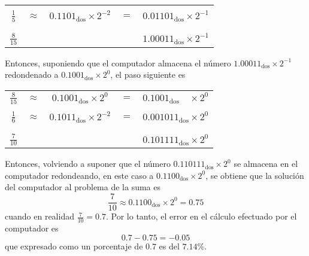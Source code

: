 \begin{solucion}
\begin{enumerate}
\begin{center}
\begin{tabular}{ccccc}
    \vspace{-0.3cm} 
    \\
    $\frac{1}{5}$ & $\approx$ & $0.1101_{\text{dos}} \times 2^{-2}$ & $=$ & $0.01101_{\text{dos}} \times 2^{-1}$ \\
    \vspace{-0.4cm}
    \\
    \hhline{-~~~-}
    \vspace{-0.4cm}
    \\
    $\frac{8}{15}$ & & & & $1.00011_{\text{dos}} \times 2^{-1}$
   \end{tabular}
  \end{center}
  Entonces, suponiendo que el computador almacena el n\'umero $1.00011_{\text{dos}}\times 2^{-1}$ redondenado a $0.1001_{\text{dos}} \times 2^{0}$, el paso siguiente es
  \begin{center}
   \begin{tabular}{ccccc}
    $\frac{8}{15}$ & $\approx$ & $0.1001_{\text{dos}}\times 2^{0}$ & $=$ & $0.1001_{\text{dos}}\phantom{10} \times 2^{0}$ \\ 
    \vspace{-0.3cm} 
    \\
    $\frac{1}{6}$ & $\approx$ & $0.1011_{\text{dos}} \times 2^{-2}$ & $=$ & $0.001011_{\text{dos}} \times 2^{0}$ \\
    \vspace{-0.4cm}
    \\
    \hhline{-~~~-}
    \vspace{-0.4cm}
    \\
    $\frac{7}{10}$ & & & & $0.101111_{\text{dos}} \times 2^{0}$
   \end{tabular}
  \end{center}
  Entonces, volviendo a suponer que el n\'umero $0.110111_{\text{dos}} \times 2^{0}$ se almacena en el computador redondeando, en este caso a $0.1100_{\text{dos}} \times 2^{0}$, se obtiene que la soluci\'on del computador al problema de la suma es
  \begin{equation*}
   \frac{7}{10} \approx 0.1100_{\text{dos}} \times 2^{0} = 0.75
  \end{equation*}
  cuando en realidad $\frac{7}{10} = 0.7$. Por lo tanto, el error en el c\'alculo efectuado por el computador es
  \begin{equation*}
   0.7 - 0.75 = -0.05
  \end{equation*}
  que expresado como un porcentaje de $0.7$ es del $7.14\%$.


\end{enumerate}
\end{solucion}
